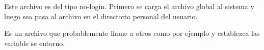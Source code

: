 \autor{\NC}
\colaborador{}
\revisor{}
\traductor{}

Este archivo es del tipo no-login. Primero se carga el archivo global
al sistema  y luego sea pasa al archivo
 en el directorio personal del usuario.

Es un archivo que probablemente llame a otros como por ejemplo
 y establezca las variable se entorno.

